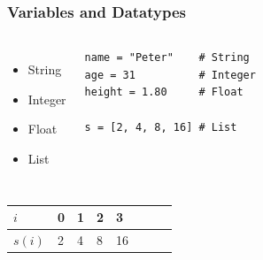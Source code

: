 \begin{frame}[fragile]

    \frametitle{Variables and Datatypes}

    \begin{columns}[t]


            \begin{itemize}
                \item String
                \item Integer
                \item Float
                \item List
            \end{itemize}


\begin{lstlisting}
name = "Peter"    # String
age = 31          # Integer
height = 1.80     # Float

s = [2, 4, 8, 16] # List
\end{lstlisting}

    \end{columns}

    \bigskip

    \centering

\begin{tabular}{llllllll}
   $i$  & 0  & 1 & 2 & 3 \\ \hline
$s(i)$ & 2 & 4 & 8 & 16  
\end{tabular}



\end{frame}



